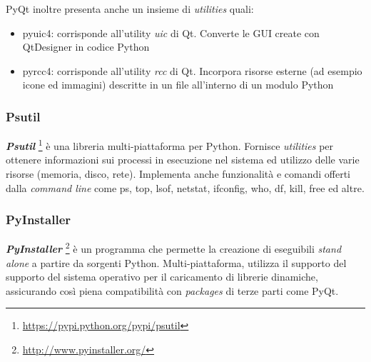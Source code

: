 PyQt inoltre presenta anche un insieme di \textit{utilities} quali:

\begin{itemize}
	\item{pyuic4: corrisponde all'utility \textit{uic} di Qt. Converte le GUI create con QtDesigner in codice Python}
	\item{pyrcc4: corrisponde all'utility \textit{rcc} di Qt. Incorpora risorse esterne (ad esempio icone ed immagini) descritte in un file all'interno di un modulo Python }
\end{itemize} 

\clearpage

\subsubsection{Psutil}
\textbf{\textit{Psutil}} \footnote{\url{https://pypi.python.org/pypi/psutil}} è una libreria multi-piattaforma per Python. Fornisce \textit{utilities} per ottenere informazioni sui processi in esecuzione nel sistema ed utilizzo delle varie risorse (memoria, disco, rete). Implementa anche funzionalità e comandi offerti dalla \textit{command line} come ps, top, lsof, netstat, ifconfig, who, df, kill, free ed altre.

\subsubsection{PyInstaller}
\textbf{\textit{PyInstaller}} \footnote{\url{http://www.pyinstaller.org/}} è un programma che permette la creazione di eseguibili \textit{stand alone} a partire da sorgenti Python. Multi-piattaforma, utilizza il supporto del supporto del sistema operativo per il caricamento di librerie dinamiche, assicurando così piena compatibilità con \textit{packages} di terze parti come PyQt.
